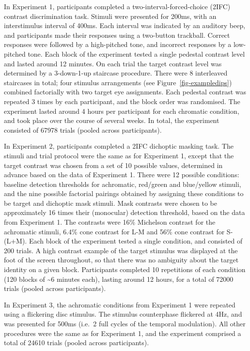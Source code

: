 \documentclass[
  letterpaper,
  DIV=11,
  numbers=noendperiod]{scrartcl}
\begin{document}
In Experiment 1, participants completed a two-interval-forced-choice
(2IFC) contrast discrimination task. Stimuli were presented for 200ms,
with an interstimulus interval of 400ms. Each interval was indicated by
an auditory beep, and participants made their responses using a
two-button trackball. Correct responses were followed by a high-pitched
tone, and incorrect responses by a low-pitched tone. Each block of the
experiment tested a single pedestal contrast level and lasted around 12
minutes. On each trial the target contrast level was determined by a
3-down-1-up staircase procedure. There were 8 interleaved staircases in
total; four stimulus arrangements (see Figure~\ref{fig-exampledips})
combined factorially with two target eye assignments. Each pedestal
contrast was repeated 3 times by each participant, and the block order
was randomised. The experiment lasted around 4 hours per participant for
each chromatic condition, and took place over the course of several
weeks. In total, the experiment consisted of 67978 trials (pooled across
participants).

In Experiment 2, participants completed a 2IFC dichoptic masking task.
The stimuli and trial protocol were the same as for Experiment 1, except
that the target contrast was chosen from a set of 10 possible values,
determined in advance based on the data of Experiment 1. There were 12
possible conditions: baseline detection thresholds for achromatic,
red/green and blue/yellow stimuli, and the nine possible factorial
pairings obtained by assigning these conditions to be target and
dichoptic mask stimuli. Mask contrasts were chosen to be approximately
16 times their (monocular) detection threshold, based on the data from
Experiment 1. The contrasts were 16\% Michelson contrast for the
achromatic stimuli, 6.4\% cone contrast for L-M and 56\% cone contrast
for S-(L+M). Each block of the experiment tested a single condition, and
consisted of 200 trials. A high contrast example of the target stimulus
was displayed at the foot of the screen throughout, so that there was no
ambiguity about the target identity on a given block. Participants
completed 10 repetitions of each condition (120 blocks of
\textasciitilde6 minutes each), lasting around 12 hours, for a total of
72000 trials (pooled across participants).

In Experiment 3, the achromatic conditions from Experiment 1 were
repeated using a flickering disc stimulus. The stimulus counterphase
flickered at 4Hz, and was presented for 500ms (i.e.~2 full cycles of the
temporal modulation). All other procedures were the same as for
Experiment 1, and the experiment comprised a total of 24610 trials
(pooled across participants).
\end{document}
